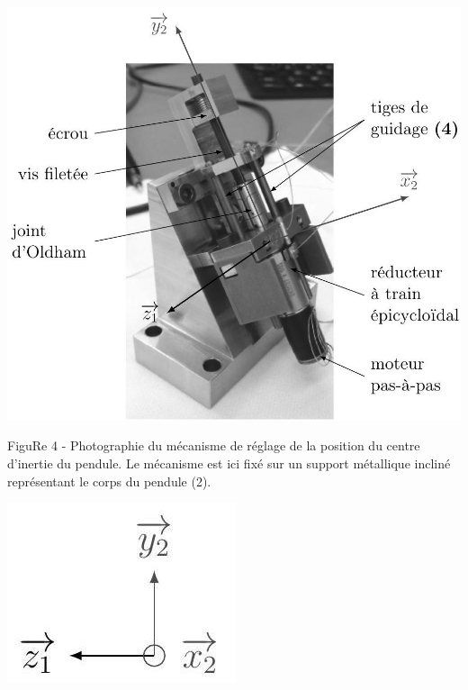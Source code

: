 \documentclass[10pt]{article}
\begin{document}
\begin{center}
\includegraphics[max width=\textwidth]{2024_04_26_3285cfc264024262add0g-05(1)}
\end{center}

FiguRe 4 - Photographie du mécanisme de réglage de la position du centre d'inertie du pendule. Le mécanisme est ici fixé sur un support métallique incliné représentant le corps du pendule (2).

\begin{center}
\includegraphics[max width=\textwidth]{2024_04_26_3285cfc264024262add0g-05(2)}
\end{center}
\end{document}
